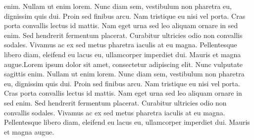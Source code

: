 \documentclass{book}
\begin{document}
enim. Nullam ut enim lorem. Nunc diam sem, vestibulum non pharetra eu, dignissim quis dui. Proin sed finibus arcu. Nam tristique eu nisi vel porta. Cras porta convallis lectus id mattis. Nam eget urna sed leo aliquam ornare in sed enim. Sed hendrerit fermentum placerat. Curabitur ultricies odio non convallis sodales. Vivamus ac ex sed metus pharetra iaculis at eu magna. Pellentesque libero diam, eleifend eu lacus eu, ullamcorper imperdiet dui. Mauris et magna augue.Lorem ipsum dolor sit amet, consectetur adipiscing elit. Nunc vulputate sagittis enim. Nullam ut enim lorem. Nunc diam sem, vestibulum non pharetra eu, dignissim quis dui. Proin sed finibus arcu. Nam tristique eu nisi vel porta. Cras porta convallis lectus id mattis. Nam eget urna sed leo aliquam ornare in sed enim. Sed hendrerit fermentum placerat. Curabitur ultricies odio non convallis sodales. Vivamus ac ex sed metus pharetra iaculis at eu magna. Pellentesque libero diam, eleifend eu lacus eu, ullamcorper imperdiet dui. Mauris et magna augue.
\end{document}
